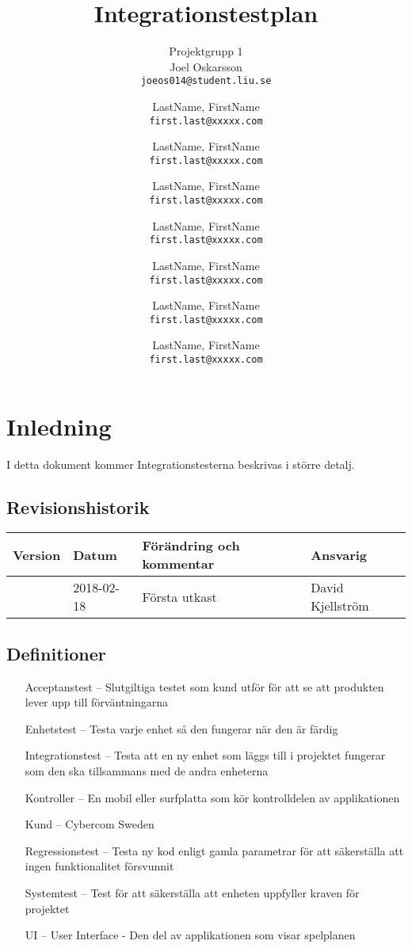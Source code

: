 \documentclass[10pt]{article}
\title{Integrationstestplan}
\author{
	Projektgrupp 1\\
	Joel Oskarsson\\
	\texttt{joeos014@student.liu.se}
	\and
	LastName, FirstName\\
	\texttt{first.last@xxxxx.com}
	\and
	LastName, FirstName\\
	\texttt{first.last@xxxxx.com}
	\and
	LastName, FirstName\\
	\texttt{first.last@xxxxx.com}
	\and
	LastName, FirstName\\
	\texttt{first.last@xxxxx.com}
  	\and
  	LastName, FirstName\\
  	\texttt{first.last@xxxxx.com}
  	\and
  	LastName, FirstName\\
  	\texttt{first.last@xxxxx.com}
  	\and
  	LastName, FirstName\\
  	\texttt{first.last@xxxxx.com}
}
\begin{document}
\maketitle
\pagebreak
\tableofcontents
\pagebreak
\section{Inledning}
     I detta dokument kommer Integrationstesterna beskrivas i större detalj.
	\subsection{Revisionshistorik}

	
	\begin{center}
 	   \begin{tabular}{| l | l | l |  l | }
 	       \hline
 	       \textbf{Version} & \textbf{Datum} & \textbf{Förändring och kommentar} & \textbf{Ansvarig} \\
 	       \hline
 	       \centering 0.1 & 2018-02-18 & Första utkast & David Kjellström\\
 	       \hline
 	   \end{tabular}
	\end{center}


	\subsection{Definitioner}
		\begin{itemize}
		\item [Acceptanstest --]Slutgiltiga testet som kund utför för att se att produkten lever upp till förväntningarna
		\item [Enhetstest --]Testa varje enhet så den fungerar när den är färdig
		\item [Integrationstest --]Testa att en ny enhet som läggs till i projektet fungerar som den ska tillsammans med de andra enheterna
		\item [Kontroller --]En mobil eller surfplatta som kör kontrolldelen av applikationen
		\item [Kund --]Cybercom Sweden
		\item [Regressionstest --]Testa ny kod enligt gamla parametrar för att säkerställa att ingen funktionalitet försvunnit
		\item [Systemtest --]Test för att säkerställa att enheten uppfyller kraven för projektet		
		\item [UI --]User Interface - Den del av applikationen som visar spelplanen
		\end{itemize}
	
\end{document}
